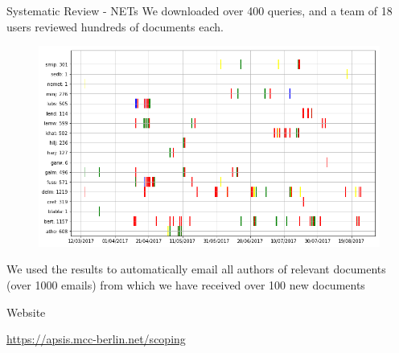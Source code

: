 \documentclass[9pt]{beamer}
\begin{document}

\begin{frame}{Systematic Review - NETs}
We downloaded over 400 queries, and a team of 18 users reviewed hundreds of documents each.
\begin{figure}
	\includegraphics[width=0.8\linewidth]{images/ratings_user_time}
\end{figure}
We used the results to automatically email all authors of relevant documents (over 1000 emails) from which we have received over 100 new documents
\end{frame}



\begin{frame}{Website}

\url{https://apsis.mcc-berlin.net/scoping}

\end{frame}




\end{document}
